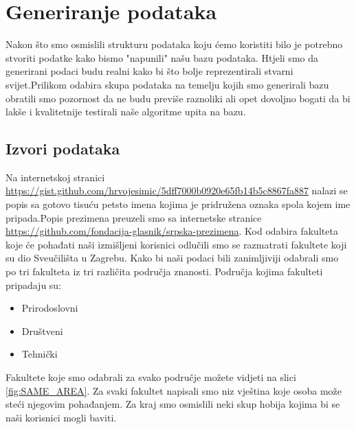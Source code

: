 \documentclass[titlepage, 12pt]{scrartcl}
\begin{document}
\section{Generiranje podataka}
Nakon što smo osmislili strukturu podataka koju ćemo koristiti bilo je potrebno stvoriti podatke kako bismo "napunili" našu bazu podataka. Htjeli smo da generirani podaci budu realni kako bi što bolje reprezentirali stvarni svijet.Prilikom odabira skupa podataka na temelju kojih smo generirali bazu obratili smo pozornost da ne budu previše raznoliki ali opet dovoljno bogati da bi lakše i kvalitetnije testirali naše algoritme upita na bazu.
\subsection{Izvori podataka}
Na internetskoj stranici \url{https://gist.github.com/hrvojesimic/5dff7000b0920e65fb14b5c8867fa887} nalazi se popis sa gotovo tisuću petsto imena kojima je pridružena oznaka spola kojem ime pripada.Popis prezimena preuzeli smo sa internetske stranice \url{https://github.com/fondacija-glasnik/srpska-prezimena}.
Kod odabira fakulteta koje će pohađati naši izmišljeni korisnici odlučili smo se razmatrati fakultete koji su dio Sveučilišta u Zagrebu. Kako bi naši podaci bili zanimljiviji odabrali smo po tri fakulteta iz tri različita područja znanosti. Područja kojima fakulteti pripadaju su:
\begin{itemize}
    \item Prirodoslovni
    \item Društveni
    \item Tehnički
\end{itemize}
Fakultete koje smo odabrali za svako područje možete vidjeti na slici \ref{fig:SAME_AREA}.
Za svaki fakultet napisali smo niz vještina koje osoba može steći njegovim pohađanjem.
Za kraj smo osmislili neki skup hobija kojima bi se naši korisnici mogli baviti.
\end{document}

